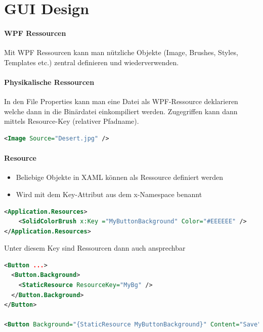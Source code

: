 \section{GUI Design}
\paragraph{WPF Ressourcen}
Mit WPF Ressourcen kann man nützliche Objekte (Image, Brushes, Styles, Templates etc.) zentral definieren und wiederverwenden.


\paragraph{Physikalische Ressourcen} In den File Properties kann man eine Datei als WPF-Ressource deklarieren welche dann in die Binärdatei einkompiliert werden. Zugegriffen kann dann mittels Resource-Key (relativer Pfadname).
\begin{lstlisting}[language=xml]
<Image Source="Desert.jpg" />
\end{lstlisting}


\paragraph{Resource}
\begin{itemize}
    \item Beliebige Objekte in XAML können als Ressource definiert werden
    \item Wird mit dem Key-Attribut aus dem x-Namespace benannt
\end{itemize}
\begin{lstlisting}[language=xml]
<Application.Resources>
    <SolidColorBrush x:Key ="MyButtonBackground" Color="#EEEEEE" />
</Application.Resources>
\end{lstlisting}
Unter diesem Key sind Ressourcen dann auch ansprechbar
\begin{lstlisting}[language=xml]
<Button ...>
  <Button.Background>
    <StaticResource ResourceKey="MyBg" />
  </Button.Background>
</Button>

<Button Background="{StaticResource MyButtonBackground}" Content="Save" />
\end{lstlisting}


